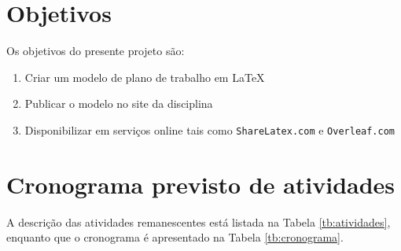 \documentclass[tcc1,project]{uftex}
\begin{document}
\section*{Objetivos}

\cite{2008:Efrat}

Os objetivos do presente projeto são: 
\begin{enumerate}
	\item Criar um modelo de plano de trabalho em \LaTeX 
	\item Publicar o modelo no site da disciplina
	\item Disponibilizar em serviços online tais como \texttt{ShareLatex.com} e \texttt{Overleaf.com}
\end{enumerate}

\section*{Cronograma previsto de atividades \label{sec:crono}}

A descrição das atividades remanescentes está listada na Tabela \ref{tb:atividades}, enquanto que o cronograma é apresentado na Tabela \ref{tb:cronograma}.

\end{document}
